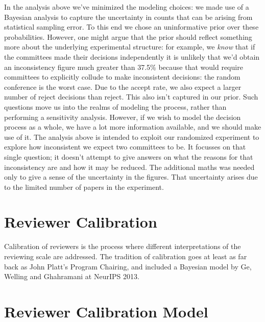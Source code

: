 In the analysis above we've minimized the modeling choices: we made use
of a Bayesian analysis to capture the uncertainty in counts that can be
arising from statistical sampling error. To this end we chose an
uninformative prior over these probabilities. However, one might argue
that the prior should reflect something more about the underlying
experimental structure: for example, we \emph{know} that if the
committees made their decisions independently it is unlikely that we'd
obtain an inconsistency figure much greater than 37.5\% because that
would require committees to explicitly collude to make inconsistent
decisions: the random conference is the worst case. Due to the accept
rate, we also expect a larger number of reject decisions than reject.
This also isn't captured in our prior. Such questions move us into the
realms of modeling the process, rather than performing a sensitivity
analysis. However, if we wish to model the decision process as a whole,
we have a lot more information available, and we should make use of it.
The analysis above is intended to exploit our randomized experiment to
explore how inconsistent we expect two committees to be. It focusses on
that single question; it doesn't attempt to give answers on what the
reasons for that inconsistency are and how it may be reduced. The
additional maths was needed only to give a sense of the uncertainty in
the figures. That uncertainty arises due to the limited number of papers
in the experiment.

\hypertarget{reviewer-calibration}{%
\section{Reviewer Calibration}\label{reviewer-calibration}}

\begin{flushright}
\end{flushright}

Calibration of reviewers is the process where different interpretations
of the reviewing scale are addressed. The tradition of calibration goes
at least as far back as John Platt's Program Chairing, and included a
Bayesian model by Ge, Welling and Ghahramani at NeurIPS 2013.

\hypertarget{reviewer-calibration-model}{%
\section{Reviewer Calibration
Model}\label{reviewer-calibration-model}}

